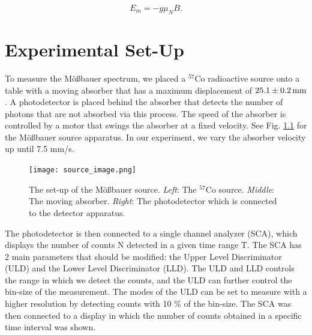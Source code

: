 \documentclass[a4paper]{report}
\numberwithin{equation}{section}
\begin{document}
\begin{equation}
		E_{m} = - g \mu _{N} B.
        \label{eq:hyperfine_en}
\end{equation}


\chapter{Experimental Set-Up} \label{sec:experiment}

To measure the M\"o{\ss}bauer spectrum, we placed a $^{57}$Co radioactive source onto a table with a moving absorber 
that has a maximum displacement of $\SI[]{25.1 \pm 0.2}[]{\milli\metre}$.  A photodetector is placed 
behind the absorber that detects the number of photons that are not absorbed via this process. The speed of the 
absorber is controlled by a motor that swings the absorber at a fixed velocity. See Fig. \ref{fig:apparatus_source}
for the M\"o{\ss}bauer source apparatus. In our experiment, we vary the absorber velocity up until 7.5 mm/s. \par 

\begin{figure}[htb!]
	\centering
	\texttt{[image: source\_image.png]}

	\caption{The set-up of the M\"o{\ss}bauer source. \textit{Left}: The $^{57}$Co source. \textit{Middle}: 
	The moving absorber. \textit{Right}: The photodetector which is connected to the detector apparatus.
	}
	\label{fig:apparatus_source}
\end{figure}

The photodetector is then connected to a single channel analyzer (SCA), which displays the number of counts N detected
in a given time range T. The SCA has 2 main parameters that should be modified:
the Upper Level Discriminator (ULD) and the Lower Level Discriminator (LLD). The ULD and LLD controls the range in which we 
detect the counts, and the ULD can further control the bin-size of the measurement. 
The modes of the ULD can be set to measure with a higher resolution by detecting counts with 
10 $\%$ of the bin-size. The SCA was then connected to a display in which the number of counts obtained in a specific time 
interval was shown. \par 




\end{document}
